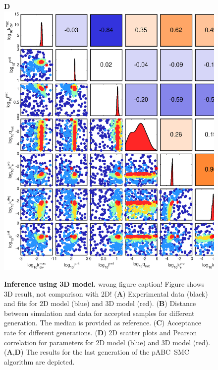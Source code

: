 \documentclass[10pt,letterpaper]{article}
\newcommand{\nj}[1]{{\color{blue}#1}}
\begin{document}
\begin{figure}[p]
\begin{adjustwidth}{-2in}{0in}
\begin{center}
\begin{minipage}[t]{0.45\textwidth}
\end{minipage}
\begin{minipage}[t]{0.85\textwidth}
	\textbf{D}\\ \includegraphics[width=\textwidth]{Data/Tumor3dGCKI67ECM-scatterPlotMatrix.eps}
\end{minipage}
\end{center}
\vspace*{0.5cm}
\caption{{\bf Inference using 3D model.} \nj{wrong figure caption! Figure shows 3D result, not comparison with 2D!}
(\textbf{A}) Experimental data (black) and fits for 2D model (blue) and 3D model (red).
(\textbf{B}) Distance between simulation and data for accepted samples for different generation. The median is provided as reference. 
(\textbf{C}) Acceptance rate for different generations.
(\textbf{D}) 2D scatter plots and Pearson correlation for parameters for 2D model (blue) and 3D model (red). 
(\textbf{A},\textbf{D}) The results for the last generation of the pABC~SMC algorithm are depicted.
}
\label{fig: fitting of 3D model to experimental data for case without nutrition limitation}
\end{adjustwidth}
\end{figure}
\end{document}
